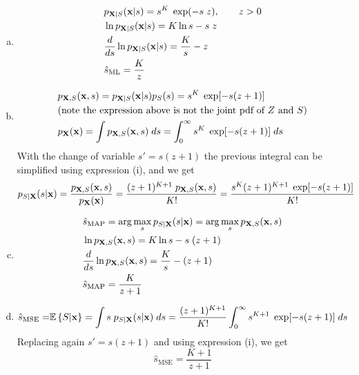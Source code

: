 \begin{solution}
~
\begin{enumerate}[a)]
    \item 
    \begin{align}
    & p_{{\bf X}|S}({\bf x}|s) = s^K \; \exp(-s\; z), \qquad z>0 \nonumber\\
    & \ln{p_{{\bf X}|S}({\bf x}|s)} = K \ln{s} - s\; z \nonumber\\ 
    & \frac{d}{ds} \ln{p_{{\bf X}|S}({\bf x}|s)} = \frac{K}{s} - z \nonumber\\
    & {\hat s}_\text{ML} = \frac{K}{z} \nonumber
    \end{align}

    \item
    \begin{align}
        & p_{{\bf X},S}({\bf x},s) = p_{{\bf X}|S}({\bf x}|s) p_S(s) = s^K \; \exp[-s(z+1)] \nonumber \\
        & \text{(note the expression above is not the joint pdf of $Z$ and $S$)} \nonumber \\
        & p_{\bf X}({\bf x}) = \int p_{{\bf X},S}({\bf x},s)\; ds = \int_0^\infty s^K \; \exp[-s(z+1)]\;ds \nonumber
    \end{align}
    With the change of variable $s' = s(z+1)$ the previous integral can be simplified using expression (i), and we get
    \begin{align}
        & p_{S|{\bf X}}(s|{\bf x}) = \displaystyle\frac{p_{{\bf X},S}({\bf x},s)}{p_{\bf X}({\bf x})} = \displaystyle\frac{(z+1)^{K+1}\;p_{{\bf X},S}({\bf x},s)}{K !} = \displaystyle\frac{s^K(z+1)^{K+1}\; \exp[-s(z+1)]}{K !} \nonumber
    \end{align}

    \item
    \begin{align}
        & {\hat s}_\text{MAP} = \arg\max_s p_{S|{\bf X}}(s|{\bf x}) = \arg\max_s p_{{\bf X},S}({\bf x},s) \nonumber \\
        & \ln{p_{{\bf X},S}({\bf x},s)} = K \ln{s} - s\;(z+1) \nonumber \\
        & \frac{d}{ds} \ln{p_{{\bf X},S}({\bf x},s)} = \frac{K}{s} - (z+1) \nonumber\\
    & {\hat s}_\text{MAP} = \frac{K}{z+1} \nonumber
    \end{align}
    
    \item
    \begin{align}
        \hat{s}_\text{MSE} = & \mathbb{E}\left\{ S | {\bf x}\right\} = \int s\; p_{S|{\bf X}}(s|{\bf x})\; ds = \displaystyle\frac{(z+1)^{K+1}}{K!} \int_{0}^{\infty} s^{K+1} \; \exp[-s(z+1)]\; ds \nonumber
    \end{align}
    Replacing again $s' = s(z+1)$ and using expression (i), we get $$\hat{s}_\text{MSE} = \frac{K+1}{z+1}$$
    

\end{enumerate}
\end{solution}
